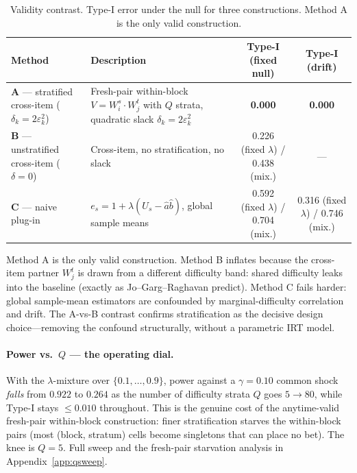 \documentclass{article}
\begin{document}
\begin{table}[h]
  \centering
  \caption{Validity contrast. Type-I error under the null for three
  constructions. Method A is the only valid construction.}
  \label{tab:validity}
  \footnotesize
  \setlength{\tabcolsep}{4pt}
  \begin{tabular}{@{}p{2.9cm}p{4.1cm}cc@{}}
    \toprule
    Method & Description & Type-I (fixed null) & Type-I (drift) \\
    \midrule
    \textbf{A} --- stratified cross-item ($\delta_k=2\varepsilon_k^2$)
      & Fresh-pair within-block $V=W_i^s\!\cdot\!W_j^t$ with $Q$ strata, quadratic slack $\delta_k=2\varepsilon_k^2$
      & \textbf{0.000} & \textbf{0.000} \\
    \addlinespace
    \textbf{B} --- unstratified cross-item ($\delta=0$)
      & Cross-item, no stratification, no slack
      & 0.226 (fixed $\lambda$) / 0.438 (mix.) & --- \\
    \addlinespace
    \textbf{C} --- naive plug-in
      & $e_s = 1 + \lambda(U_s - \hat{a}\hat{b})$, global sample means
      & 0.592 (fixed $\lambda$) / 0.704 (mix.) & 0.316 (fixed $\lambda$) / 0.746 (mix.) \\
    \bottomrule
  \end{tabular}
\end{table}

Method A is the only valid construction. Method B inflates because the cross-item
partner $W_j^t$ is drawn from a different difficulty band: shared difficulty leaks
into the baseline (exactly as Jo--Garg--Raghavan \citep{jo2602} predict). Method
C fails harder: global sample-mean estimators are confounded by marginal-difficulty
correlation and drift. The A-vs-B contrast confirms stratification as the decisive
design choice---removing the confound structurally, without a parametric IRT
model.

\paragraph{Power vs.\ $Q$ --- the operating dial.}
With the $\lambda$-mixture over $\{0.1,\ldots,0.9\}$, power against a
$\gamma=0.10$ common shock \emph{falls} from $0.922$ to $0.264$ as the number of
difficulty strata $Q$ goes $5 \to 80$, while Type-I stays $\le 0.010$ throughout.
This is the genuine cost of the anytime-valid fresh-pair within-block
construction: finer stratification starves the within-block pairs (most
(block, stratum) cells become singletons that can place no bet). The knee is
$Q=5$. Full sweep and the fresh-pair starvation analysis in
Appendix~\ref{app:qsweep}.
\end{document}
